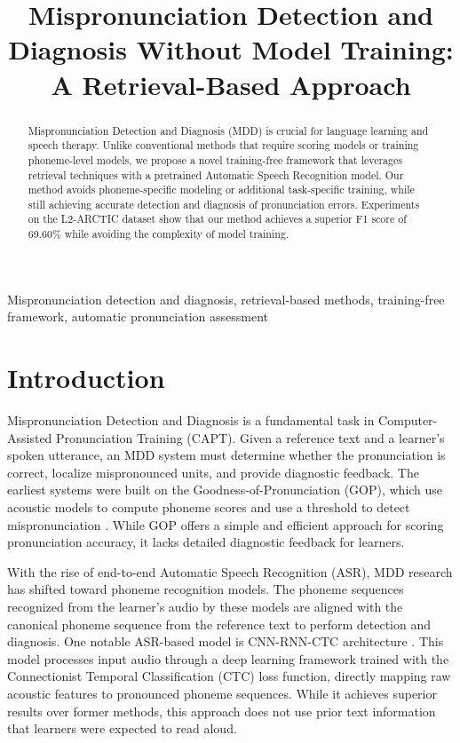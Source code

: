 \documentclass{article}
\title{Mispronunciation Detection and Diagnosis Without Model Training: A Retrieval-Based Approach}
\begin{document}
%
\maketitle
%
\begin{abstract}
Mispronunciation Detection and Diagnosis (MDD) is crucial for language learning and speech therapy. Unlike conventional methods that require scoring models or training phoneme-level models, we propose a novel training-free framework that leverages retrieval techniques with a pretrained Automatic Speech Recognition model. Our method avoids phoneme-specific modeling or additional task-specific training, while still achieving accurate detection and diagnosis of pronunciation errors. Experiments on the L2-ARCTIC dataset show that our method achieves a superior F1 score of 69.60\% while avoiding the complexity of model training.
\end{abstract}
%
\begin{keywords}
Mispronunciation detection and diagnosis, retrieval-based methods, training-free framework, automatic pronunciation assessment
\end{keywords}
%
\section{Introduction}
\label{sec:intro}

Mispronunciation Detection and Diagnosis is a fundamental task in Computer-Assisted Pronunciation Training (CAPT). Given a reference text and a learner’s spoken utterance, an MDD system must determine whether the pronunciation is correct, localize mispronounced units, and provide diagnostic feedback. The earliest systems were built on the Goodness-of-Pronunciation (GOP), which use acoustic models to compute phoneme scores and use a threshold to detect mispronunciation \cite{gop1}. While GOP offers a simple and efficient approach for scoring pronunciation accuracy, it lacks detailed diagnostic feedback for learners.

With the rise of end-to-end Automatic Speech Recognition (ASR), MDD research has shifted toward phoneme recognition models. The phoneme sequences recognized from the learner's audio by these models are aligned with the canonical phoneme sequence from the reference text to perform detection and diagnosis. One notable ASR-based model is CNN-RNN-CTC architecture \cite{cnn-rnn-ctc}. This model processes input audio through a deep learning framework trained with the Connectionist Temporal Classification (CTC) \cite{ctc} loss function, directly mapping raw acoustic features to pronounced phoneme sequences. While it achieves superior results over former methods, this approach does not use prior text information that learners were expected to read aloud.
 
\end{document}

